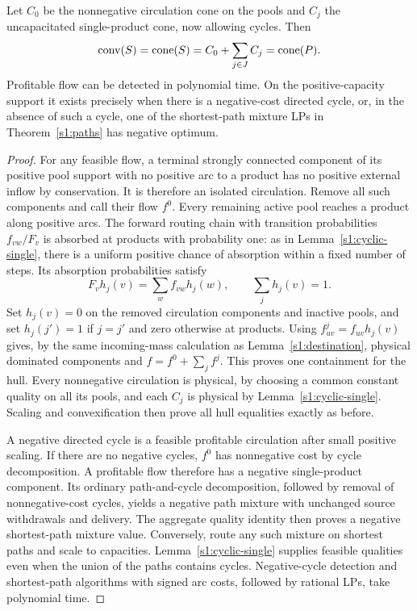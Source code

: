 \begin{theorem}\label{s1:cyclic-sign}
Let $C_0$ be the nonnegative circulation cone on the pools and $C_j$
the uncapacitated single-product cone, now allowing cycles. Then
\[
 \operatorname{conv}(S)=\operatorname{cone}(S)=C_0+\sum_{j\in J}C_j=\operatorname{cone}(P).
\]
Profitable flow can be detected in polynomial time. On the
positive-capacity support it exists precisely when there is a
negative-cost directed cycle, or, in the absence of such a cycle,
one of the shortest-path mixture LPs in Theorem~\ref{s1:paths} has
negative optimum.
\end{theorem}
\begin{proof}
For any feasible flow, a terminal strongly connected component of its
positive pool support with no positive arc to a product has no positive
external inflow by conservation. It is therefore an isolated circulation.
Remove all such components and call their flow $f^0$. Every remaining
active pool reaches a product along positive arcs. The forward routing
chain with transition probabilities $f_{vw}/F_v$ is absorbed at products
with probability one: as in Lemma~\ref{s1:cyclic-single}, there is a
uniform positive chance of absorption within a fixed number of steps.
Its absorption probabilities satisfy
\[
 F_vh_j(v)=\sum_wf_{vw}h_j(w),\qquad\sum_jh_j(v)=1.
\]
Set $h_j(v)=0$ on the removed circulation components and inactive pools,
and set $h_j(j')=1$ if $j=j'$ and zero otherwise at products.
Using $f^j_{uv}=f_{uv}h_j(v)$ gives, by the same incoming-mass
calculation as Lemma~\ref{s1:destination}, physical dominated components
and $f=f^0+\sum_jf^j$. This proves one containment for the hull.
Every nonnegative circulation is physical, by choosing a common constant
quality on all its pools, and each $C_j$ is physical by
Lemma~\ref{s1:cyclic-single}. Scaling and convexification then prove all
hull equalities exactly as before.

A negative directed cycle is a feasible profitable circulation after
small positive scaling. If there are no negative cycles, $f^0$ has
nonnegative cost by cycle decomposition. A profitable flow therefore
has a negative single-product component. Its ordinary path-and-cycle
decomposition, followed by removal of nonnegative-cost cycles, yields
a negative path mixture with unchanged source withdrawals and delivery.
The aggregate quality identity then proves a negative shortest-path
mixture value. Conversely, route any such mixture on shortest paths
and scale to capacities. Lemma~\ref{s1:cyclic-single} supplies feasible
qualities even when the union of the paths contains cycles. Negative-cycle
detection and shortest-path algorithms with signed arc costs, followed
by rational LPs, take polynomial time.
\end{proof}

